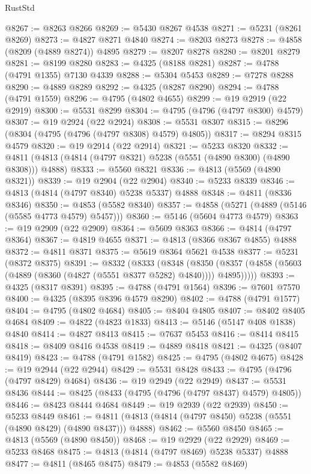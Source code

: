\begin{lexlean}{RustStd}
\begin{coremodule}
@8267 := @8263 @8266
@8269 := @5430 @8267 @4538
@8271 := @5231 (@8261 @8269)
@8273 := @4827 @8271 @4840
@8274 := @8203 @8273
@8278 := @4858 (@8209 (@4889 @8274)) @4895
@8279 := @8207 @8278
@8280 := @8201 @8279
@8281 := @8199 @8280
@8283 := @4325 (@8188 @8281)
@8287 := @4788 (@4791 @1355) @7130 @4339
@8288 := @5304 @5453
@8289 := @7278 @8288
@8290 := @4889 @8289
@8292 := @4325 (@8287 @8290)
@8294 := @4788 (@4791 @1559)
@8296 := @4795 (@4802 @4655)
@8299 := @19 @2919 (@22 @2919)
@8300 := @5531 @8299
@8304 := @4795 (@4796 (@4797 @8300) @4579)
@8307 := @19 @2924 (@22 @2924)
@8308 := @5531 @8307
@8315 := @8296 (@8304 (@4795 (@4796 (@4797 @8308) @4579) @4805))
@8317 := @8294 @8315 @4579
@8320 := @19 @2914 (@22 @2914)
@8321 := @5233 @8320
@8332 := @4811 (@4813 (@4814 (@4797 @8321) @5238 (@5551 (@4890 @8300) (@4890 @8308))) @4888)
@8333 := @5560 @8321
@8336 := @4813 (@5569 (@4890 @8321))
@8339 := @19 @2904 (@22 @2904)
@8340 := @5233 @8339
@8346 := @4813 (@4814 (@4797 @8340) @5238 @5337) @4888
@8348 := @4811 (@8336 @8346)
@8350 := @4853 (@5582 @8340)
@8357 := @4858 (@5271 (@4889 (@5146 (@5585 @4773 @4579) @5457)))
@8360 := @5146 (@5604 @4773 @4579)
@8363 := @19 @2909 (@22 @2909)
@8364 := @5609 @8363
@8366 := @4814 (@4797 @8364)
@8367 := @4819 @4655
@8371 := @4813 (@8366 @8367 @4855) @4888
@8372 := @4811 @8371
@8375 := @5619 @8364 @5621 @4538
@8377 := @5231 (@8372 @8375)
@8391 := @8332
    (@8333
      (@8348
        (@8350 (@8357 (@4858 (@5603 (@4889 (@8360 (@4827 (@5551 @8377 @5282) @4840)))) @4895)))))
@8393 := @4325 (@8317 @8391)
@8395 := @4788 (@4791 @1564)
@8396 := @7601 @7570
@8400 := @4325 (@8395 @8396 @4579 @8290)
@8402 := @4788 (@4791 @1577)
@8404 := @4795 (@4802 @4684)
@8405 := @8404 @4805
@8407 := @8402 @8405 @4684
@8409 := @4822 (@4823 @1833)
@8413 := @5146 (@5147 @408 @1838) @4840
@8414 := @4827 @8413
@8415 := @7637 @5453
@8416 := @8414 @8415
@8418 := @8409 @8416 @4538
@8419 := @4889 @8418
@8421 := @4325 (@8407 @8419)
@8423 := @4788 (@4791 @1582)
@8425 := @4795 (@4802 @4675)
@8428 := @19 @2944 (@22 @2944)
@8429 := @5531 @8428
@8433 := @4795 (@4796 (@4797 @8429) @4684)
@8436 := @19 @2949 (@22 @2949)
@8437 := @5531 @8436
@8444 := @8425 (@8433 (@4795 (@4796 (@4797 @8437) @4579) @4805))
@8446 := @8423 @8444 @4684
@8449 := @19 @2939 (@22 @2939)
@8450 := @5233 @8449
@8461 := @4811 (@4813 (@4814 (@4797 @8450) @5238 (@5551 (@4890 @8429) (@4890 @8437))) @4888)
@8462 := @5560 @8450
@8465 := @4813 (@5569 (@4890 @8450))
@8468 := @19 @2929 (@22 @2929)
@8469 := @5233 @8468
@8475 := @4813 (@4814 (@4797 @8469) @5238 @5337) @4888
@8477 := @4811 (@8465 @8475)
@8479 := @4853 (@5582 @8469)

\end{coremodule}
\end{lexlean}
